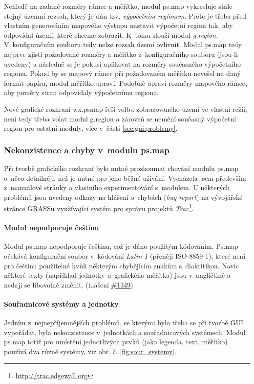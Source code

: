 \documentclass[a4paper,12pt,draft]{article}
\begin{document}
Nehledě na zadané rozměry rámce a měřítko, modul ps.map vykresluje stále stejný
územní rozsah, který je dán tzv. \emph{výpočetním regionem}.
Proto je třeba před vlastním generováním mapového výstupu
nastavit výpočetní region tak, aby odpovídal území, které chceme
zobrazit. K~tomu slouží modul \emph{g.region}. V~konfigu\-račním souboru
tedy nelze rozsah území ovlivnit.
Modul ps.map tedy nejprve zjistí požadované rozměry a měřítko
z~konfiguračního souboru (jsou-li uvedeny) a následně se je pokusí
aplikovat na rozměry současného výpočetního regionu. Pokud by se mapový
rámec při požadovaném měřítku nevešel na daný formát papíru,
modul měřítko upraví. Podobně upraví rozměry mapového rámce, aby
poměry stran odpovídaly výpočetnímu regionu.

Nové grafické rozhraní wx.psmap řeší volbu zobrazovaného území ve
vlastní režii, není tedy třeba volat modul g.region a zároveň
se nemění současný výpočetní region pro ostatní moduly, více v~části
\ref{sec:gui:problemy}.


\subsubsection{Nekonzistence a chyby v~modulu ps.map}
\label{sec:psmap:chyby}
Při tvorbě grafického rozhraní bylo nutné prozkoumat chování
modulu ps.map o~něco detailněji, než je nutné pro jeho běžné
užívání. Vycházela jsem především z~manu\-álové stránky \cite{manual}
a vlastního experimentování s~modulem.
U některých problémů jsou uvedeny
odkazy na hlášení o~chybách (\emph{bug report}) na vývojářské stránce
GRASSu \cite{trac} využívající systém pro správu projektů
\emph{Trac}\footnote{\url{http://trac.edgewall.org}}.


\paragraph*{Modul nepodporuje češtinu}
\label{sec:psmap:cestina}
Modul ps.map nepodporuje češtinu, což je dáno použitým
kódováním. Ps.map očekává konfigurační soubor v~kódování
\emph{Latin-1} (pře\-něji ISO-8859-1), které není pro češtinu použitelné
kvůli některým chybějícím zna\-kům s~diakritikou. Navíc některé texty
(například jednotky u~grafického měřítka) jsou v~angličtině a nedají se
libovolně změnit. (hlášení \href{https://trac.osgeo.org/grass/ticket/1349}{%
\#1349})

\paragraph*{Souřadnicové systémy a jednotky}
\label{sec:psmap:sour_systemy}
Jedním z~nejnepříjemnějších problémů, se kterými bylo třeba se při
tvorbě GUI vypořádat, byla nekonzistence v~jednotkách a souřadnicových
systémech. Modul ps.map totiž pro umístění jednotlivých prvků
(jako legenda, text, měřítko) používá dva různé systémy, viz
obr. č. \ref{fig:sour_systemy}.
\end{document}

